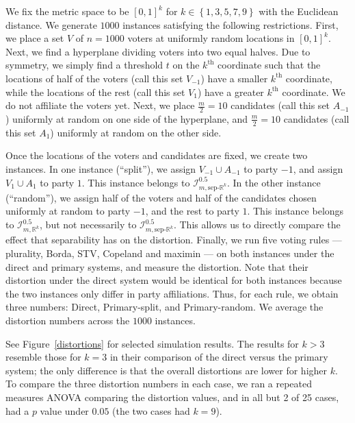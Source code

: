 \documentclass[letterpaper]{article} %
\theoremstyle{definition}
\newcommand{\set}[1]{\left\{#1\right\}}
\newcommand{\bbR}{\mathbb{R}}
\newcommand{\calI}{\mathcal{I}}
\newcommand{\pleft}{-1}
\newcommand{\pright}{1}
\newcommand{\sep}{\textrm{sep-}}
\newcommand{\euc}[1]{\bbR^{#1}}
\newcommand{\eucsep}[1]{\sep\euc{#1}}
\newcommand{\I}{\calI}
\begin{document}
We fix the metric space to be $[0,1]^k$ for $k \in \set{1,3,5,7,9}$ with the Euclidean distance. We generate $1000$ instances satisfying the following restrictions. First, we place a set $V$ of $n = 1000$ voters at uniformly random locations in $[0,1]^k$. Next, we find a hyperplane dividing voters into two equal halves. Due to symmetry, we simply find a threshold $t$ on the $k^{\text{th}}$ coordinate such that the locations of half of the voters (call this set $V_{\pleft}$) have a smaller $k^{\text{th}}$ coordinate, while the locations of the rest (call this set $V_{\pright}$) have a greater $k^{\text{th}}$ coordinate. We do not affiliate the voters yet. Next, we place $\frac{m}{2} = 10$ candidates (call this set $A_{\pleft}$) uniformly at random on one side of the hyperplane,  and $\frac{m}{2} = 10$ candidates (call this set $A_{\pright}$) uniformly at random on the other side.

Once the locations of the voters and candidates are fixed, we create two instances. In one instance (``split''), we assign $V_{\pleft} \cup A_{\pleft}$ to party $\pleft$, and assign $V_{\pright} \cup A_{\pright}$ to party $\pright$. This instance belongs to $\I^{0.5}_{m,\eucsep{k}}$. In the other instance (``random''), we assign half of the voters and half of the candidates chosen uniformly at random to party $\pleft$, and the rest to party $\pright$. This instance belongs to $\I^{0.5}_{m,\euc{k}}$, but not necessarily to $\I^{0.5}_{m,\eucsep{k}}$. This allows us to directly compare the effect that separability has on the distortion. Finally, we run five voting rules --- plurality, Borda, STV, Copeland and maximin --- on both instances under the direct and primary systems, and measure the distortion. Note that their distortion under the direct system would be identical for both instances because the two instances only differ in party affiliations. Thus, for each rule, we obtain three numbers: Direct, Primary-split, and Primary-random. We average the distortion numbers across the $1000$ instances. 

See Figure~\ref{distortions} for selected simulation results. The results for $k > 3$ resemble those for $k=3$ in their comparison of the direct versus the primary system; the only difference is that the overall distortions are lower for higher $k$. To compare the three distortion numbers in each case, we ran a repeated measures ANOVA comparing the distortion values, and in all but 2 of 25 cases, had a $p$ value under $0.05$ (the two cases had $k=9$). 
\end{document}
